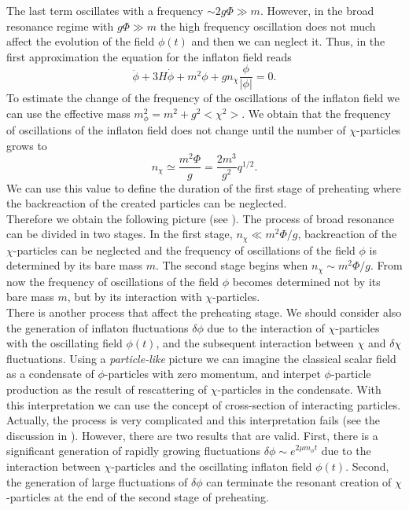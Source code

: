 \documentclass[11pt,a4paper,twoside]{book}
\begin{document}
The last term oscillates with a frequency $\sim 2g\Phi \gg m$. However, in the broad resonance regime with $ g\Phi \gg m $ the high frequency oscillation does not much affect the evolution of the field $ \phi(t) $ and then we can neglect it.
Thus, in the first approximation the equation for the inflaton field reads
\begin{equation}
	\label{Chap4:Backreaction_EquationPhiFinal}
	\ddot{\phi} + 3H\dot{\phi} + m^{2}\phi + gn_{\chi}\frac{\phi}{|\phi|} = 0.
\end{equation}
To estimate the change of the frequency of the oscillations of the inflaton field we can use the effective mass $ m^{2}_{\phi}=m^{2} + g^{2}<\chi^{2}> $. We obtain that the frequency of oscillations of the inflaton field does not change until the number of $ \chi $-particles grows to 
\begin{equation}
\label{Chap4:Backreaction_CriterionFirstStage}
n_{\chi} \simeq \frac{m^{2}\Phi}{g}=\frac{2m^{3}}{g^{2}}q^{1/2}.
\end{equation}
We can use this value to define the duration of the first stage of preheating where the backreaction of the created particles can be neglected. \\
Therefore we obtain the following picture (see \cite{Chap4:LindePreheatingModel}). The process of broad resonance can be divided in two stages. In the first stage, $ n_{\chi} \ll m^{2}\Phi/g $, backreaction of the $ \chi $-particles can be neglected and the frequency of oscillations of the field $ \phi $ is determined by its bare mass $ m $. The second stage begins when $ n_{\chi} \sim m^{2}\Phi/g $. From now the frequency of oscillations of the field $\phi$ becomes determined not by its bare mass $ m $, but by its interaction with $\chi$-particles.\\
There is another process that affect the preheating stage. We should consider also the generation of inflaton fluctuations $\delta \phi$ due to the interaction of $\chi$-particles with the oscillating field $\phi(t)$, and the subsequent interaction between $\chi$ and $\delta \chi$ fluctuations. Using a \textit{particle-like} picture we can imagine the classical scalar field as a condensate of $\phi$-particles with zero momentum, and interpet $\phi$-particle production as the result of rescattering of $ \chi $-particles in the condensate. With this interpretation we can use the concept of cross-section of interacting particles. Actually, the process is very complicated and this interpretation fails (see the discussion in \cite{Chap4:LindePreheatingModel}). However, there are two results that are valid. First, there is a significant generation of rapidly growing fluctuations $ \delta \phi \sim e^{2\mu m_{\phi}t} $ due to the interaction between $ \chi $-particles and the oscillating inflaton field $ \phi(t) $. Second, the generation of large fluctuations of $\delta \phi$ can terminate the resonant creation of $\chi$-particles at the end of the second stage of preheating. \\
\end{document}
